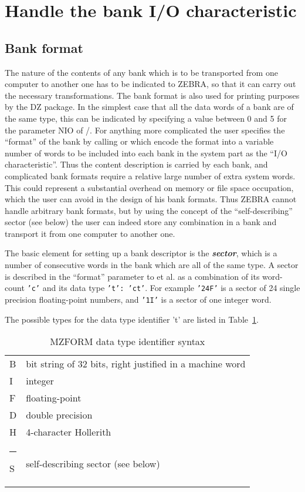 \section{Handle the bank I/O characteristic}
\subsection{Bank format}
\par The nature of the contents of any bank which is to be transported
from one computer to another one has to be indicated to ZEBRA,
so that it can carry out the necessary transformations.
The bank format is also used for printing purposes by the DZ package.
In the simplest case that all the data words of a bank are
of the same type, this can be indicated by specifying a value between 0
and 5 for the parameter NIO of /.
For anything more complicated the user specifies the ``format''
of the bank by calling  or  which encode the format
into a variable number of words to be included into each bank
in the system part as the ``I/O characteristic''.
Thus the content description is carried by each bank,
and complicated bank formats require a relative large number
of extra system words.
This could represent a substantial overhead on memory
or file space occupation,
which the user can avoid in the design of his bank formats.
Thus ZEBRA cannot handle arbitrary bank formats,
but by using the concept of the ``self-describing'' sector (see below)
the user can indeed store any combination in a bank
and transport it from one computer to another one.
\par The basic element for setting up a bank descriptor is the
{\bf\it sector},
which is a number of consecutive words in the bank which are
all of the same type.
A sector is described in the ``format'' parameter to  et al.
as a combination of its word-count
{\tt 'c'} and its data type {\tt 't': 'ct'}.
For example
{\tt '24F'}
is a sector of 24 single precision floating-point
numbers, and {\tt '1I'}
is a sector of one integer word.
\par The possible types for the data type identifier 't'
are listed in Table~\ref{MZFORMT}.
\begin{table}[h]
\caption{MZFORM data type identifier syntax}
\label{MZFORMT}
\begin{center}\begin{tabular}{|l|l|}
\hline
\rule{0mm}{5mm}B&bit string of 32 bits, right justified in a machine word\\
I&integer\\
F&floating-point\\
D&double precision\\
H&4-character Hollerith\\
\rule{-2mm}{6mm}S&self-describing sector (see below)\\ \hline
\end{tabular}\end{center}\end{table}
